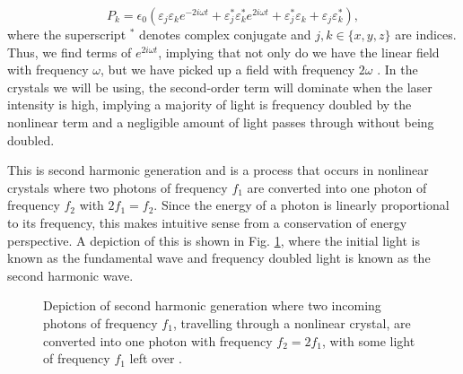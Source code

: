 \begin{equation}
  P_k = \epsilon_0 \left( \varepsilon_j \varepsilon_k e^{-2i\omega t} + \varepsilon_j^* \varepsilon_k^* e^{2i\omega t} + \varepsilon_j^* \varepsilon_k + \varepsilon_j \varepsilon_k^* \right),
  \label{freqdoubledfield}
\end{equation}
%
where the superscript $^*$ denotes complex conjugate and $j,k \in \{ x,y,z \}$ are indices. Thus, we find terms of $e^{2i\omega t}$, implying that not only do we have the linear field with frequency $\omega$, but we have picked up a field with frequency $2\omega$ \cite{Dood2006}. In the crystals we will be using, the second-order term will dominate when the laser intensity is high, implying a majority of light is frequency doubled by the nonlinear term and a negligible amount of light passes through without being doubled.


This is second harmonic generation and is a process that occurs in nonlinear crystals where two photons of frequency $f_1$ are converted into one photon of frequency $f_2$ with $2 f_1 =f_2$. Since the energy of a photon is linearly proportional to its frequency, this makes intuitive sense from a conservation of energy perspective. A depiction of this is shown in Fig. \ref{fig:SHG}, where the initial light is known as the fundamental wave and frequency doubled light is known as the second harmonic wave.


\begin{figure}[ht!]
  \centering
  
  \caption{Depiction of second harmonic generation where two incoming photons of frequency $f_1$, travelling through a nonlinear crystal, are converted into one photon with frequency $f_2 = 2f_1$, with some light of frequency $f_1$ left over \protect\cite{SHG}.}
  \label{fig:SHG}
\end{figure}

